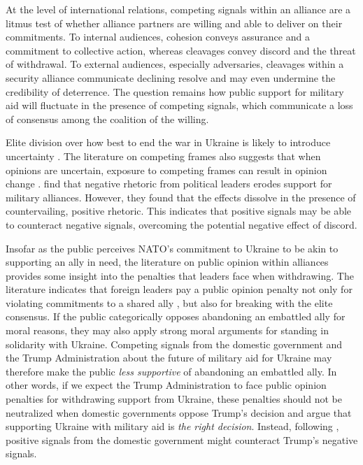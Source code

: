 At the level of international relations, competing signals within an alliance are a litmus test of whether alliance partners are willing and able to deliver on their commitments. To internal audiences, cohesion conveys assurance and a commitment to collective action, whereas cleavages convey discord and the threat of withdrawal.\autocite{jakobbarrett_how_2026} To external audiences, especially adversaries, cleavages within a security alliance communicate declining resolve and may even undermine the credibility of deterrence. The question remains how public support for military aid will fluctuate in the presence of competing signals, which communicate a loss of consensus among the coalition of the willing.  

Elite division over how best to end the war in Ukraine is likely to introduce uncertainty \autocite{berinsky_assuming_2007}. The literature on competing frames also suggests that when opinions are uncertain, exposure to competing frames can result in opinion change \autocite{matthes_diachronic_2012}. \textcite{chu_commanding_2021} find that negative rhetoric from political leaders erodes support for military alliances. However, they found that the effects dissolve in the presence of countervailing, positive rhetoric. This indicates that positive signals may be able to counteract negative signals, overcoming the potential negative effect of discord. 

Insofar as the public perceives NATO's commitment to Ukraine to be akin to supporting an ally in need, the literature on public opinion within alliances provides some insight into the penalties that leaders face when withdrawing. 
The literature indicates that foreign leaders pay a public opinion penalty not only for violating commitments to a shared ally \autocite{tomz_military_2021, chiba_careful_2015}, but also for breaking with the elite consensus. \autocite{chu_commanding_2021, reiter_manipulating_2024} If the public categorically opposes abandoning an embattled ally for moral reasons, they may also apply strong moral arguments for standing in solidarity with Ukraine. Competing signals from the domestic government and the Trump Administration about the future of military aid for Ukraine may therefore make the public \emph{less supportive} of abandoning an embattled ally. In other words, if we expect the Trump Administration to face public opinion penalties for withdrawing support from Ukraine, these penalties should not be neutralized when domestic governments oppose Trump's decision and argue that supporting Ukraine with military aid is \emph{the right decision}. Instead, following \textcite{chu_commanding_2021}, positive signals from the domestic government might counteract Trump's negative signals. 

